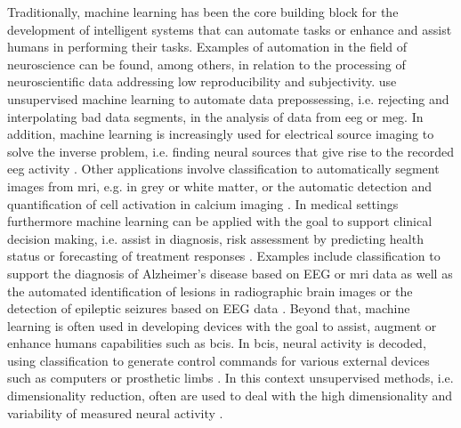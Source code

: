 Traditionally, machine learning has been the core building block for the development of intelligent systems that can automate tasks or enhance and assist humans in performing their tasks. Examples of automation in the field of neuroscience can be found, among others, in relation to the processing of neuroscientific data addressing low reproducibility and subjectivity. \citeauthor{Jas2017} \cite{Jas2017} use unsupervised machine learning to automate data prepossessing, i.e. rejecting and interpolating bad data segments, in the analysis of data from \gls{eeg} or \gls{meg}. In addition, machine learning is increasingly used for electrical source imaging to solve the inverse problem, i.e. finding neural sources that give rise to the recorded \gls{eeg} activity \cite{Cui2019,Hecker2021}. Other applications involve classification to automatically segment images from \gls{mri}, e.g. in grey or white matter, or the automatic detection and quantification of cell activation in calcium imaging \cite{Akkus2017}. In medical settings furthermore machine learning can be applied with the goal to support clinical decision making, i.e. assist in diagnosis, risk assessment by predicting health status or forecasting of treatment responses \cite{Woo2017}. Examples include classification to support the diagnosis of Alzheimer's disease based on EEG \cite{Gallego-Jutglà2015} or \gls{mri} \cite{Vemuri2008} data as well as the automated identification of lesions in radiographic brain images \cite{Zhou208} or the detection of epileptic seizures based on EEG data \cite{Vandecasteele2020}. Beyond that, machine learning is often used in developing devices with the goal to assist, augment or enhance humans capabilities such as \glspl{bci}. In \glspl{bci}, neural activity is decoded, using classification to generate control commands for various external devices such as computers or prosthetic limbs \cite{Saha2021, Anumanchipalli2019}. In this context unsupervised methods, i.e. dimensionality reduction, often are used to deal with the high dimensionality and variability of measured neural activity \cite{Brunton2019}.\\
